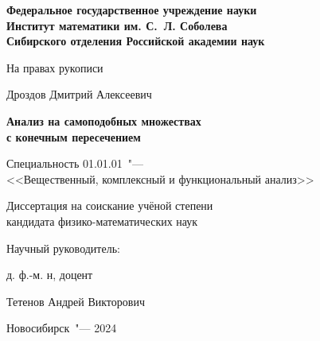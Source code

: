 \thispagestyle{empty}
\begin{center}
\textbf{
Федеральное государственное учреждение науки\\
Институт математики им. С.~Л. Соболева\\
Сибирского отделения Российской академии наук}
\end{center}

\vspace{0pt plus4fill}
\begin{flushright}
На правах рукописи
\end{flushright}


\vspace{0pt plus6fill}
\begin{center}
{\large Дроздов Дмитрий Алексеевич}
\end{center}

\vspace{0pt plus1fill}
\begin{center}
\textbf {\large %
Анализ на самоподобных множествах \\
с конечным пересечением}

\vspace{0pt plus2fill} 
{%
Специальность 01.01.01\ "---\\
<<Вещественный, комплексный и функциональный анализ>>}

\vspace{0pt plus2fill}
Диссертация на соискание учёной степени\\
кандидата физико-математических наук
\end{center}

\vspace{0pt plus4fill}
\noindent\hspace{0.6\textwidth}Научный руководитель:

\noindent\hspace{0.6\textwidth}д. ф.-м. н, доцент

\noindent\hspace{0.6\textwidth}Тетенов Андрей Викторович


\vspace{0pt plus4fill}
{\centering Новосибирск\ "--- 2024\par}